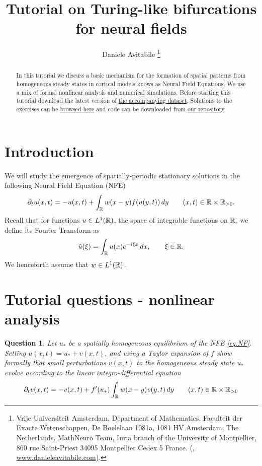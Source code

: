 \documentclass[a4paper]{siamonline220329}
\title{Tutorial on Turing-like bifurcations for neural fields}
\author{%
  Daniele Avitabile%
  \thanks{%
    Vrije Universiteit Amsterdam,
    Department of Mathematics,
    Faculteit der Exacte Wetenschappen,
    De Boelelaan 1081a,
    1081 HV Amsterdam, The Netherlands.
  \protect
    MathNeuro Team,
    Inria branch of the University of Montpellier,
    860 rue Saint-Priest
    34095 Montpellier Cedex 5
    France.
  \protect
    (\email{d.avitabile@vu.nl}, \url{www.danieleavitabile.com}).
  }
}
\theoremstyle{plain}
\newtheorem{question}{Question}
\begin{document}
\maketitle

\begin{abstract}
  In this tutorial we discuss a basic mechanism for the formation of spatial patterns
  from homogeneous steady states in cortical models knows as Neural Field Equations.
  We use a mix of formal nonlinear analysis and numerical simulations. Before
  starting this tutorial download the latest version of \href{https://zenodo.org/records/11215758}{the accompanying
  dataset}. Solutions to the exercises can be 
  \href{http://htmlpreview.github.io/?https://github.com/danieleavitabile/numerical-analysis-mathematical-neuroscience/blob/main/Tutorials/Tutorial1/Solutions/html/driver.html}{browsed here}
  and code can be downloaded from
  \href{https://github.com/danieleavitabile/numerical-analysis-mathematical-neuroscience/tree/main}{our
  repository}.
\end{abstract}

\section{Introduction}\label{sec:intro} 
We will study the emergence of spatially-periodic stationary solutions in the
following Neural Field Equation (NFE)
\begin{equation}\label{eq:NF}
  \partial_{t}u(x,t) = -u(x,t) + \int_{\RSet}w(x-y)f(u(y,t)) \,d y \qquad (x,t) \in
  \RSet \times \RSet_{>0}.
\end{equation}
Recall that for functions $u \in L^1(\mathbb{R})$, the space of integrable functions on
$\mathbb{R}$, we define its Fourier Transform as
\[
  \hat u(\xi) = \int_{\mathbb{R}} u(x) e^{-i\xi x} \,d x, \qquad \xi \in \mathbb{R}.
\]
We henceforth assume that $w \in L^1(\mathbb{R})$.

\section{Tutorial questions - nonlinear analysis}\label{sec:questions} 
\begin{question}\label{question:linearisation}
Let $u_*$ be a spatially homogeneous equilibrium
of the NFE \cref{eq:NF}. Setting $u(x,t) = u_* + v(x,t)$, and using a Taylor
expansion of $f$ show formally that small perturbations $v(x,t)$ to the homogeneous
steady state $u_*$ evolve according to the linear integro-differential equation
\begin{equation}\label{eq:linear}
  \partial_{t}v(x,t) = -v(x,t) + f'(u_*)\int_{\RSet}w(x-y)v(y,t) \,d y \qquad (x,t) \in \RSet \times \RSet_{>0}
\end{equation}
\end{question}
\end{document}

